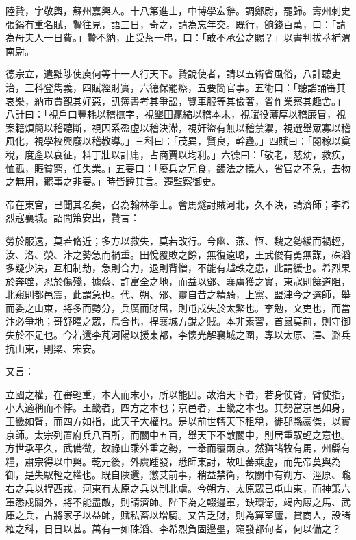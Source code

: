 
\begin{pinyinscope}

 陸贄，字敬輿，蘇州嘉興人。十八第進士，中博學宏辭。調鄭尉，罷歸。壽州刺史張鎰有重名賦，贄往見，語三日，奇之，請為忘年交。既行，餉錢百萬，曰：「請為母夫人一日費。」贄不納，止受茶一串，曰：「敢不承公之賜？」以書判拔萃補渭南尉。



 德宗立，遣黜陟使庾何等十一人行天下。贄說使者，請以五術省風俗，八計聽吏治，三科登雋義，四賦經財實，六德保罷瘵，五要簡官事。五術曰：「聽謠誦審其哀樂，納市賈觀其好惡，訊簿書考其爭訟，覽車服等其儉奢，省作業察其趣舍。」八計曰：「視戶口豐耗以稽撫字，視墾田贏縮以稽本末，視賦役薄厚以稽廉冒，視案籍煩簡以稽聽斷，視囚系盈虛以稽決滯，視奸盜有無以稽禁禦，視選舉眾寡以稽風化，視學校興廢以稽教導。」三科曰：「茂異，賢良，幹蠱。」四賦曰：「閱稼以奠稅，度產以衰征，料丁壯以計庸，占商賈以均利。」六德曰：「敬老，慈幼，救疾，恤孤，賑貧窮，任失業。」五要曰：「廢兵之冗食，蠲法之撓人，省官之不急，去物之無用，罷事之非要。」時皆韙其言。遷監察御史。



 帝在東宮，已聞其名矣，召為翰林學士。會馬燧討賊河北，久不決，請濟師；李希烈寇襄城。詔問策安出，贄言：



 勞於服遠，莫若脩近；多方以救失，莫若改行。今幽、燕、恆、魏之勢緩而禍輕，汝、洛、滎、汴之勢急而禍重。田悅覆敗之餘，無復遠略，王武俊有勇無謀，硃滔多疑少決，互相制劫，急則合力，退則背憎，不能有越軼之患，此謂緩也。希烈果於奔噬，忍於傷殘，據蔡、許富全之地，而益以鄧、襄虜獲之實，東寇則饟道阻，北窺則都邑震，此謂急也。代、朔、邠、靈自昔之精騎，上黨、盟津今之選師，舉而委之山東，將多而勢分，兵廣而財屈，則屯戍失於太繁也。李勉，文吏也，而當汴必爭地；哥舒曜之眾，烏合也，捍襄城方銳之賊。本非素習，首鼠莫前，則守御失於不足也。今若還李芃河陽以援東都，李懷光解襄城之圍，專以太原、澤、潞兵抗山東，則梁、宋安。



 又言：



 立國之權，在審輕重，本大而末小，所以能固。故治天下者，若身使臂，臂使指，小大適稱而不悖。王畿者，四方之本也；京邑者，王畿之本也。其勢當京邑如身，王畿如臂，而四方如指，此天子大權也。是以前世轉天下租稅，徙郡縣豪傑，以實京師。太宗列置府兵八百所，而關中五百，舉天下不敵關中，則居重馭輕之意也。方世承平久，武備微，故祿山乘外重之勢，一舉而覆兩京。然猶諸牧有馬，州縣有糧，肅宗得以中興。乾元後，外虞踵發，悉師東討，故吐蕃乘虛，而先帝莫與為御，是失馭輕之權也。既自陜還，懲艾前事，稍益禁衛，故關中有朔方、涇原、隴右之兵以捍西戎，河東有太原之兵以制北虜。今朔方、太原眾已屯山東，而神策六軍悉戍關外，將不能盡敵，則請濟師。陛下為之輟邊軍，缺環衛，竭內廄之馬、武庫之兵，占將家子以益師，賦私畜以增騎。又告乏財，則為算室廬，貸商人，設諸榷之科，日日以甚。萬有一如硃滔、李希烈負固邊壘，竊發都甸者，何以備之？




\end{pinyinscope}
